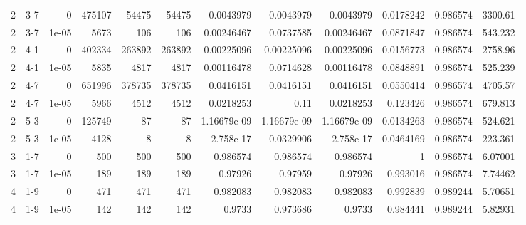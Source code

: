 \begin{tabular}{rlrrrrrrrrrr}
     2 & 3-7    &      0     &      475107 &             54475 &             54475 &     0.0043979   &     0.0043979   &      0.0043979   &        0.0178242 &               0.986574 &         3300.61    \\
     2 & 3-7    &      1e-05 &        5673 &               106 &               106 &     0.00246467  &     0.0737585   &      0.00246467  &        0.0871847 &               0.986574 &          543.232   \\
     2 & 4-1    &      0     &      402334 &            263892 &            263892 &     0.00225096  &     0.00225096  &      0.00225096  &        0.0156773 &               0.986574 &         2758.96    \\
     2 & 4-1    &      1e-05 &        5835 &              4817 &              4817 &     0.00116478  &     0.0714628   &      0.00116478  &        0.0848891 &               0.986574 &          525.239   \\
     2 & 4-7    &      0     &      651996 &            378735 &            378735 &     0.0416151   &     0.0416151   &      0.0416151   &        0.0550414 &               0.986574 &         4705.57    \\
     2 & 4-7    &      1e-05 &        5966 &              4512 &              4512 &     0.0218253   &     0.11        &      0.0218253   &        0.123426  &               0.986574 &          679.813   \\
     2 & 5-3    &      0     &      125749 &                87 &                87 &     1.16679e-09 &     1.16679e-09 &      1.16679e-09 &        0.0134263 &               0.986574 &          524.621   \\
     2 & 5-3    &      1e-05 &        4128 &                 8 &                 8 &     2.758e-17   &     0.0329906   &      2.758e-17   &        0.0464169 &               0.986574 &          223.361   \\
     3 & 1-7    &      0     &         500 &               500 &               500 &     0.986574    &     0.986574    &      0.986574    &        1         &               0.986574 &            6.07001 \\
     3 & 1-7    &      1e-05 &         189 &               189 &               189 &     0.97926     &     0.97959     &      0.97926     &        0.993016  &               0.986574 &            7.74462 \\
     4 & 1-9    &      0     &         471 &               471 &               471 &     0.982083    &     0.982083    &      0.982083    &        0.992839  &               0.989244 &            5.70651 \\
     4 & 1-9    &      1e-05 &         142 &               142 &               142 &     0.9733      &     0.973686    &      0.9733      &        0.984441  &               0.989244 &            5.82931 \\
\hline
\end{tabular}
